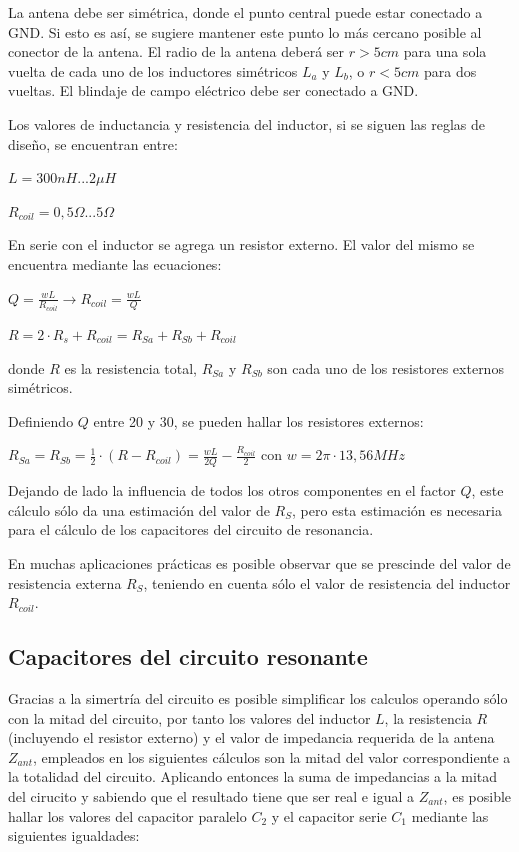 
La antena debe ser simétrica, donde el punto central puede estar conectado a GND. Si esto es así, se sugiere mantener este punto lo más cercano posible al conector de la antena.
El radio de la antena deberá ser $r > 5cm$ para una sola vuelta de cada uno de los inductores simétricos $L_{a}$ y $L_{b}$, o $r < 5cm$ para dos vueltas.
El blindaje de campo eléctrico debe ser conectado a GND.

Los valores de inductancia y resistencia del inductor, si se siguen las reglas de diseño, se encuentran entre: 

$ L = 300nH {...} 2\mu H $

$ R_{coil} =0,5\Omega {...} 5\Omega $


\bigskip
\begin{itshape}
\end{itshape}


En serie con el inductor se agrega un resistor externo. El valor del mismo se encuentra mediante las ecuaciones:

\centerline{$ Q = \frac{w L}{R_{coil}} \rightarrow R_{coil} = \frac{w L}{Q}$}

\centerline{$ R = 2 \cdot R_{s} + R_{coil} = R_{Sa} + R_{Sb} + R_{coil} $}

donde $R$ es la resistencia total, $R_{Sa}$ y $R_{Sb}$ son cada uno de los resistores externos simétricos.

Definiendo $Q$ entre 20 y 30, se pueden hallar los resistores externos:

$R_{Sa} = R_{Sb} = \frac{1}{2} \cdot (R - R_{coil}) = \frac{wL}{2Q} - \frac{R_{coil}}{2}$ con $w = 2 \pi \cdot 13,56 MHz$


Dejando de lado la influencia de todos los otros componentes en el factor $Q$, este cálculo sólo da una estimación del valor de $R_{S}$, pero esta estimación es necesaria para el cálculo de los capacitores del circuito de resonancia. 

\bigskip
\bigskip
	En muchas aplicaciones prácticas es posible observar que se prescinde del valor de 	resistencia externa $R_{S}$, teniendo en cuenta sólo el valor de resistencia del inductor $R_{coil}$.	

\subsection{Capacitores del circuito resonante}
Gracias a la simertría del circuito es posible simplificar los calculos operando sólo con la mitad del circuito, por tanto los valores del inductor $L$, la resistencia $R$ (incluyendo el resistor externo) y el valor de impedancia requerida de la antena $Z_{ant}$, empleados en los siguientes cálculos son la mitad del valor correspondiente a la totalidad del circuito. 
Aplicando entonces la suma de impedancias a la mitad del cirucito y sabiendo que el resultado tiene que ser real e igual a $Z_{ant}$, es posible hallar los valores del capacitor paralelo $C_{2}$ y el capacitor serie $C_{1}$ mediante las siguientes igualdades:

